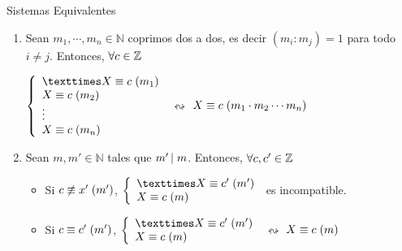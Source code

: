 \documentclass[10pt]{article}
\begin{document}
\begin{propo}{Sistemas Equivalentes}
 \begin{enumerate}
  \item Sean $m_1, \cdots , m_n \in \mathbb{N}$ coprimos dos a dos, es decir $(m_i : m_j)=1$ para todo $i \neq j$. Entonces, $\forall c \in \entero{}$
  \begin{center}
  $\left\lbrace \begin{array}{l}
                × \congruente{X}{c}{m_1} \\
                  \congruente{X}{c}{m_2} \\
                  \vdots              \\
                  \congruente{X}{c}{m_n}
               \end{array}\right.$ $\leftrightsquigarrow$ $\congruente{X}{c}{m_1 \cdot m_2 \cdots m_n}$
  \end{center}
  \item Sean $m, m' \in \mathbb{N}$ tales que $\divi{m'}{m}$. Entonces, $\forall c, c' \in \entero{}$
  \begin{itemize}
   \item Si $c \not\equiv x' \es{0.1}(m')$, $\left\lbrace \begin{array}{l}
                                                           ×\congruente{X}{c'}{m'} \\
                                                            \congruente{X}{c}{m} 
                                                          \end{array}\right.$ es incompatible. 
   \item Si $\congruente{c}{c'}{m'}$, $\left\lbrace \begin{array}{l}
                                                           ×\congruente{X}{c'}{m'} \\
                                                            \congruente{X}{c}{m} 
                                                          \end{array}\right.$ $\leftrightsquigarrow$ $\congruente{X}{c}{m}$
  \end{itemize}
 \end{enumerate}
\end{propo}
\end{document}
